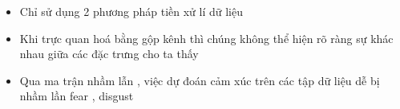 \begin{itemize}
    \item Chỉ sử dụng 2 phương pháp tiền xử lí dữ liệu
    \item Khi trực quan hoá bằng gộp kênh thì chúng không thể hiện rõ ràng sự khác nhau giữa các đặc trưng cho ta thấy
    \item Qua ma trận nhầm lẫn , việc dự đoán cảm xúc trên các tập dữ liệu dễ bị nhầm lần fear  , disgust
\end{itemize}
